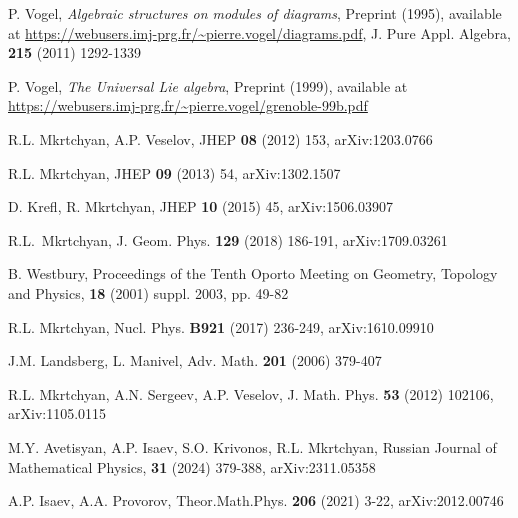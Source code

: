 \documentclass{article}
\begin{document}
\begin{thebibliography}{12}

 P. Vogel, {\sl Algebraic structures on modules of diagrams}, Preprint (1995), available at \url{https://webusers.imj-prg.fr/~pierre.vogel/diagrams.pdf}, J. Pure Appl. Algebra, {\bf 215} (2011) 1292-1339

  P. Vogel, {\sl The Universal Lie algebra}, Preprint (1999), available at \url{https://webusers.imj-prg.fr/~pierre.vogel/grenoble-99b.pdf}

 R.L. Mkrtchyan, A.P. Veselov, %
JHEP {\bf 08} (2012) 153, arXiv:1203.0766

 R.L. Mkrtchyan, %
JHEP {\bf 09} (2013) 54, arXiv:1302.1507

 D. Krefl, R. Mkrtchyan, %
JHEP {\bf 10} (2015) 45, arXiv:1506.03907

 R.L.~Mkrtchyan,
J. Geom. Phys. \textbf{129} (2018) 186-191,
arXiv:1709.03261

 B. Westbury, %
Proceedings of the Tenth Oporto Meeting on Geometry, Topology and Physics, {\bf 18} (2001) suppl. 2003, pp. 49-82


 R.L. Mkrtchyan, %
Nucl. Phys. {\bf B921} (2017) 236-249, arXiv:1610.09910

 J.M. Landsberg, L. Manivel, %
Adv. Math. {\bf 201} (2006) 379-407

 R.L. Mkrtchyan, A.N. Sergeev, A.P. Veselov, %
J. Math. Phys. {\bf 53} (2012) 102106, arXiv:1105.0115

 M.Y. Avetisyan, A.P. Isaev, S.O. Krivonos, R.L. Mkrtchyan, %
Russian Journal of Mathematical Physics, {\bf 31} (2024) 379-388, arXiv:2311.05358

 A.P. Isaev, A.A. Provorov, %
Theor.Math.Phys. {\bf 206} (2021) 3-22, arXiv:2012.00746


\end{thebibliography}
\end{document}
